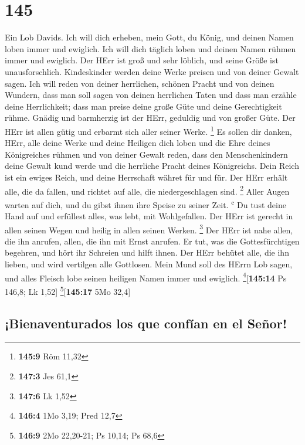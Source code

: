 \hypertarget{section-144}{%
\section{145}\label{section-144}}

 Ein Lob Davids. Ich will dich erheben, mein Gott, du
König, und deinen Namen loben immer und ewiglich.  Ich
will dich täglich loben und deinen Namen rühmen immer und ewiglich.
 Der HErr ist groß und sehr löblich, und seine Größe ist
unausforschlich.  Kindeskinder werden deine Werke preisen
und von deiner Gewalt sagen.  Ich will reden von deiner
herrlichen, schönen Pracht und von deinen Wundern,  dass
man soll sagen von deinen herrlichen Taten und dass man erzähle deine
Herrlichkeit;  dass man preise deine große Güte und deine
Gerechtigkeit rühme.  Gnädig und barmherzig ist der HErr,
geduldig und von großer Güte.  Der HErr ist allen gütig
und erbarmt sich aller seiner Werke. \footnote{\textbf{145:9} Röm 11,32}
 Es sollen dir danken, HErr, alle deine Werke und deine
Heiligen dich loben  und die Ehre deines Königreiches
rühmen und von deiner Gewalt reden,  dass den
Menschenkindern deine Gewalt kund werde und die herrliche Pracht deines
Königreichs.  Dein Reich ist ein ewiges Reich, und deine
Herrschaft währet für und für.  Der HErr erhält alle, die
da fallen, und richtet auf alle, die niedergeschlagen sind. \footnote{\textbf{147:3}
  Jes 61,1}  Aller Augen warten auf dich, und du gibst
ihnen ihre Speise zu seiner Zeit. \textsuperscript{c}  Du
tust deine Hand auf und erfüllest alles, was lebt, mit Wohlgefallen.
 Der HErr ist gerecht in allen seinen Wegen und heilig in
allen seinen Werken. \footnote{\textbf{147:6} Lk 1,52} 
Der HErr ist nahe allen, die ihn anrufen, allen, die ihn mit Ernst
anrufen.  Er tut, was die Gottesfürchtigen begehren, und
hört ihr Schreien und hilft ihnen.  Der HErr behütet
alle, die ihn lieben, und wird vertilgen alle Gottlosen. 
Mein Mund soll des HErrn Lob sagen, und alles Fleisch lobe seinen
heiligen Namen immer und ewiglich. \footnote{\textbf{146:4} 1Mo 3,19;
  Pred 12,7}{[}\textbf{145:14} Ps 146,8; Lk 1,52{]}
\footnote{\textbf{146:9} 2Mo 22,20-21; Ps 10,14; Ps 68,6}{[}\textbf{145:17}
5Mo 32,4{]}

\hypertarget{bienaventurados-los-que-confuxedan-en-el-seuxf1or}{%
\subsection{¡Bienaventurados los que confían en el
Señor!}\label{bienaventurados-los-que-confuxedan-en-el-seuxf1or}}

